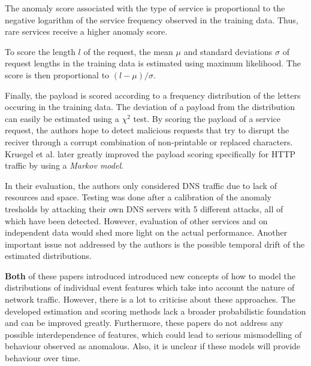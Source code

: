 \documentclass[a4paper,12pt,twoside]{report}
\begin{document}
The anomaly score associated with the type of service is proportional to the negative logarithm of the service frequency observed in the training data. Thus, rare services receive a higher anomaly score. 

To score the length $l$ of the request, the mean $\mu$ and standard deviations $\sigma$ of request lengths in the training data is estimated using maximum likelihood. The score is then proportional to $(l-\mu)/\sigma$.

Finally, the payload is scored according to a frequency distribution of the letters occuring in the training data. The deviation of a payload from the distribution can easily be estimated using a $\chi^2$ test. By scoring the payload of a service request, the authors hope to detect malicious requests that try to disrupt the reciver through a corrupt combination of non-printable or replaced characters. Kruegel et al. \cite{kruegel2005multi} later greatly improved the payload scoring specifically for HTTP traffic by using a \textit{Markov model}.


In their evaluation, the authors only considered DNS traffic due to lack of resources and space. Testing was done after a calibration of the anomaly tresholds by attacking their own DNS servers with 5 different attacks, all of which have been detected. However, evaluation of other services and on independent data would shed more light on the actual performance. Another important issue not addressed by the authors is the possible temporal drift of the estimated distributions.



\textbf{Both} of these papers introduced introduced new concepts of how to model the distributions of individual event features which take into account the nature of network traffic. However, there is a lot to criticise about these approaches. The developed estimation and scoring methods lack a broader probabilistic foundation and can be improved greatly. Furthermore, these papers do not address any possible interdependence of features, which could lead to serious mismodelling of behaviour observed as anomalous. Also, it is unclear if these models will provide behaviour over time.




\end{document}

